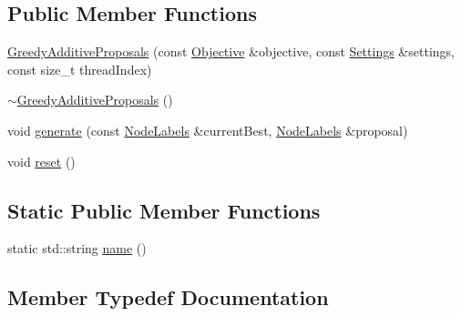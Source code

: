 \subsection*{Public Member Functions}
\begin{DoxyCompactItemize}
\item 
\hyperlink{classnifty_1_1graph_1_1GreedyAdditiveProposals_ab4aeb45e9e6eeea7e3d874341096f8d2}{Greedy\+Additive\+Proposals} (const \hyperlink{classnifty_1_1graph_1_1GreedyAdditiveProposals_a678640a8ae0ec9d3f7cf3df4fab0ccd6}{Objective} \&objective, const \hyperlink{structnifty_1_1graph_1_1GreedyAdditiveProposals_1_1Settings}{Settings} \&settings, const size\+\_\+t thread\+Index)
\item 
\hyperlink{classnifty_1_1graph_1_1GreedyAdditiveProposals_a3852bac39c9105ca4505409ea0ac7eca}{$\sim$\+Greedy\+Additive\+Proposals} ()
\item 
void \hyperlink{classnifty_1_1graph_1_1GreedyAdditiveProposals_a567b9dd4f5be1f15cafb14524add6a18}{generate} (const \hyperlink{classnifty_1_1graph_1_1GreedyAdditiveProposals_aeec70a0521e576f19b603759f4e67ff4}{Node\+Labels} \&current\+Best, \hyperlink{classnifty_1_1graph_1_1GreedyAdditiveProposals_aeec70a0521e576f19b603759f4e67ff4}{Node\+Labels} \&proposal)
\item 
void \hyperlink{classnifty_1_1graph_1_1GreedyAdditiveProposals_a3b532e6f5fad12db170bb7ee74aefcf8}{reset} ()
\end{DoxyCompactItemize}
\subsection*{Static Public Member Functions}
\begin{DoxyCompactItemize}
\item 
static std\+::string \hyperlink{classnifty_1_1graph_1_1GreedyAdditiveProposals_a6fe07f49cfda3fb2ac06931b0f27a727}{name} ()
\end{DoxyCompactItemize}


\subsection{Member Typedef Documentation}
\hypertarget{classnifty_1_1graph_1_1GreedyAdditiveProposals_aa088cd2fe857e6fa292c96f7c9ffbc00}{}

